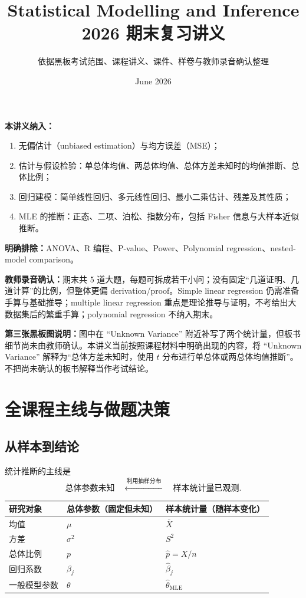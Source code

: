 \documentclass[11pt,a4paper]{article}
\title{\textbf{Statistical Modelling and Inference}\\[0.3em]
2026 期末复习讲义}
\author{依据黑板考试范围、课程讲义、课件、样卷与教师录音确认整理}
\date{June 2026}
\newcommand{\1}{\mathbf{1}}
\begin{document}
\maketitle

\begin{scopebox}[考试范围说明]
\textbf{本讲义纳入：}
\begin{enumerate}
  \item 无偏估计（unbiased estimation）与均方误差（MSE）；
  \item 估计与假设检验：单总体均值、两总体均值、总体方差未知时的均值推断、总体比例；
  \item 回归建模：简单线性回归、多元线性回归、最小二乘估计、残差及其性质；
  \item MLE 的推断：正态、二项、泊松、指数分布，包括 Fisher 信息与大样本近似推断。
\end{enumerate}

\textbf{明确排除：}ANOVA、R 编程、P-value、Power、Polynomial regression、nested-model comparison。

\textbf{教师录音确认：}期末共 5 道大题，每题可拆成若干小问；没有固定“几道证明、几道计算”的比例，但整体更偏 derivation/proof。Simple linear regression 仍需准备手算与基础推导；multiple linear regression 重点是理论推导与证明，不考给出大数据集后的繁重手算；polynomial regression 不纳入期末。

\textbf{第三张黑板图说明：}图中在 ``Unknown Variance'' 附近补写了两个统计量，但板书细节尚未由教师确认。本讲义当前按照课程材料中明确出现的内容，将 ``Unknown Variance'' 解释为“总体方差未知时，使用 $t$ 分布进行单总体或两总体均值推断”。不把尚未确认的板书解释当作考试结论。
\end{scopebox}

\tableofcontents
\newpage

\section{全课程主线与做题决策}

\subsection{从样本到结论}

统计推断的主线是
\[
  \text{总体参数未知}
  \quad \xleftarrow{\ \text{利用抽样分布}\ }\quad
  \text{样本统计量已观测}.
\]

\begin{center}
\begin{tabular}{lll}
\toprule
研究对象 & 总体参数（固定但未知） & 样本统计量（随样本变化）\\
\midrule
均值 & $\mu$ & $\bar X$\\
方差 & $\sigma^2$ & $S^2$\\
总体比例 & $p$ & $\hat p=X/n$\\
回归系数 & $\beta_j$ & $\hat\beta_j$\\
一般模型参数 & $\theta$ & $\hat\theta_{\mathrm{MLE}}$\\
\bottomrule
\end{tabular}
\end{center}
\end{document}
